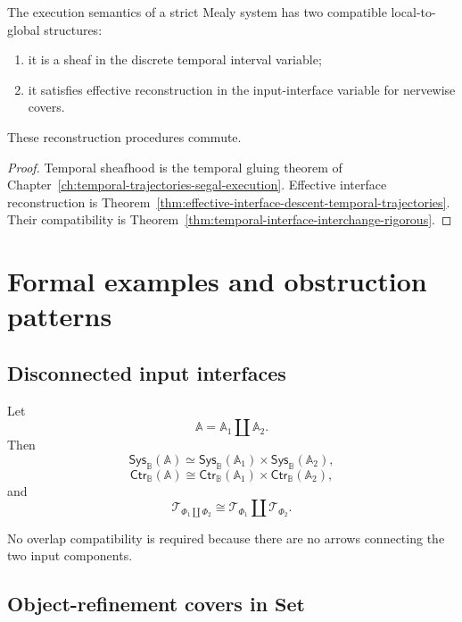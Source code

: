 \begin{theorem}
\label{thm:two-dimensional-locality-execution}
The execution semantics of a strict Mealy system has two compatible
local-to-global structures:
\begin{enumerate}
    \item it is a sheaf in the discrete temporal interval variable;
    \item it satisfies effective reconstruction in the input-interface
    variable for nervewise covers.
\end{enumerate}
These reconstruction procedures commute.
\end{theorem}

\begin{proof}
Temporal sheafhood is the temporal gluing theorem of
Chapter~\ref{ch:temporal-trajectories-segal-execution}.
Effective interface reconstruction is
Theorem~\ref{thm:effective-interface-descent-temporal-trajectories}.
Their compatibility is
Theorem~\ref{thm:temporal-interface-interchange-rigorous}.
\end{proof}

\section{Formal examples and obstruction patterns}
\label{sec:formal-examples-interface-descent}

\subsection{Disconnected input interfaces}
\label{subsec:example-disconnected-input-interfaces}

Let
\[
    \mathbb A
    =
    \mathbb A_1\amalg\mathbb A_2.
\]
Then
\[
    \mathsf{Sys}_{\mathbb B}(\mathbb A)
    \simeq
    \mathsf{Sys}_{\mathbb B}(\mathbb A_1)
    \times
    \mathsf{Sys}_{\mathbb B}(\mathbb A_2),
\]
\[
    \mathsf{Ctr}_{\mathbb B}(\mathbb A)
    \cong
    \mathsf{Ctr}_{\mathbb B}(\mathbb A_1)
    \times
    \mathsf{Ctr}_{\mathbb B}(\mathbb A_2),
\]
and
\[
    \mathscr T_{\Phi_1\amalg\Phi_2}
    \cong
    \mathscr T_{\Phi_1}
    \amalg
    \mathscr T_{\Phi_2}.
\]

No overlap compatibility is required because there are no arrows connecting
the two input components.

\subsection{Object-refinement covers in \(\mathbf{Set}\)}
\label{subsec:example-object-refinement-cover}

